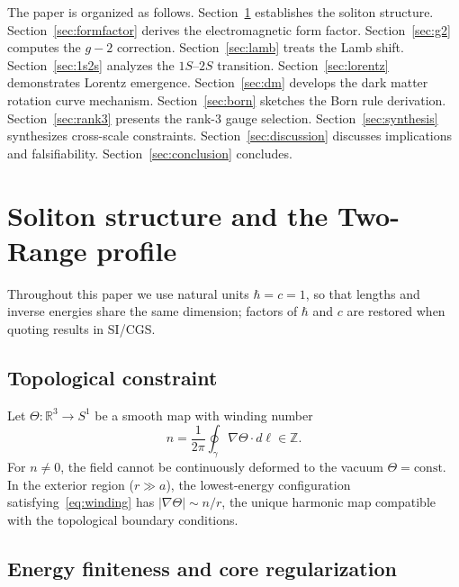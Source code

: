﻿\documentclass[a4paper,12pt]{article}
\begin{document}
The paper is organized as follows.
Section~\ref{sec:soliton} establishes the soliton structure.
Section~\ref{sec:formfactor} derives the electromagnetic form factor.
Section~\ref{sec:g2} computes the $g{-}2$ correction.
Section~\ref{sec:lamb} treats the Lamb shift.
Section~\ref{sec:1s2s} analyzes the $1S$--$2S$ transition.
Section~\ref{sec:lorentz} demonstrates Lorentz emergence.
Section~\ref{sec:dm} develops the dark matter rotation curve mechanism.
Section~\ref{sec:born} sketches the Born rule derivation.
Section~\ref{sec:rank3} presents the rank-3 gauge selection.
Section~\ref{sec:synthesis} synthesizes cross-scale constraints.
Section~\ref{sec:discussion} discusses implications and falsifiability.
Section~\ref{sec:conclusion} concludes.

\section{Soliton structure and the Two-Range profile}
\label{sec:soliton}

Throughout this paper we use natural units $\hbar=c=1$, so that
lengths and inverse energies share the same dimension; factors of
$\hbar$ and $c$ are restored when quoting results in SI/CGS.

\subsection{Topological constraint}

Let $\Theta:\mathbb{R}^3\to S^1$ be a smooth map with winding number
\begin{equation}
  n = \frac{1}{2\pi}\oint_\gamma \nabla\Theta\cdot d\bm{\ell}
    \in\mathbb{Z}.
  \label{eq:winding}
\end{equation}
For $n\neq 0$, the field cannot be continuously deformed to the vacuum
$\Theta=\text{const}$.  In the exterior region ($r\gg a$), the
lowest-energy configuration satisfying~\eqref{eq:winding} has
$|\nabla\Theta|\sim n/r$, the unique harmonic map compatible with the
topological boundary conditions.

\subsection{Energy finiteness and core regularization}
\label{sec:core}
\end{document}

